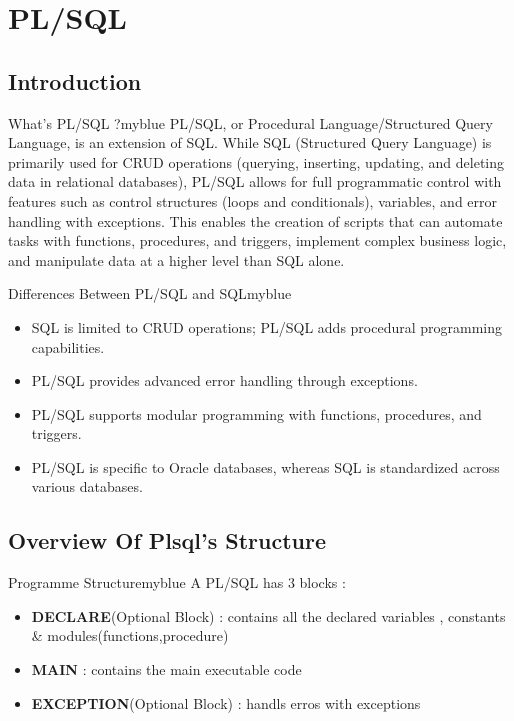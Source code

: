 
\section{PL/SQL}
\subsection{Introduction}

\begin{prettyBox}{What's PL/SQL ?}{myblue}
PL/SQL, or Procedural Language/Structured Query Language, is an extension of SQL. While SQL (Structured Query Language) is primarily used for CRUD operations (querying, inserting, updating, and deleting data in relational databases), PL/SQL allows for full programmatic control with features such as control structures (loops and conditionals), variables, and error handling with exceptions. This enables the creation of scripts that can automate tasks with functions, procedures, and triggers, implement complex business logic, and manipulate data at a higher level than SQL alone.
\end{prettyBox}

\vspace{0.25cm}

\begin{prettyBox}{Differences Between PL/SQL and SQL}{myblue}
\begin{itemize}
    \item SQL is limited to CRUD operations; PL/SQL adds procedural programming capabilities.
    \item PL/SQL provides advanced error handling through exceptions.
    \item PL/SQL supports modular programming with functions, procedures, and triggers.
    \item PL/SQL is specific to Oracle databases, whereas SQL is standardized across various databases.
\end{itemize} 
\end{prettyBox}

\vspace{0.5cm}

\subsection{Overview Of Plsql's Structure}

\begin{prettyBox}{Programme Structure}{myblue}
A PL/SQL has 3 blocks :
\begin{itemize}
    \item \textbf{DECLARE}(Optional Block) : contains all the declared variables , constants \& modules(functions,procedure) 
    \item \textbf{MAIN} : contains the main executable code 
    \item \textbf{EXCEPTION}(Optional Block) : handls erros with exceptions 
\end{itemize}
\end{prettyBox}

